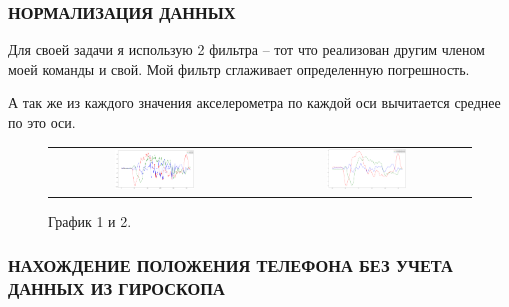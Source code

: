 \subsubsection{НОРМАЛИЗАЦИЯ ДАННЫХ}
Для своей задачи я использую 2 фильтра – тот что реализован другим членом моей команды и свой. Мой фильтр сглаживает определенную погрешность. 

\begin{figure}[H]
\end{figure}

А так же из каждого значения акселерометра по каждой оси вычитается среднее по это оси.

\begin{figure}[H]
    \begin{center}
        \begin{tabular}{cc}
            \includegraphics[width=0.4\textwidth]{sam_images/graph_1.png} & 
            \includegraphics[width=0.4\textwidth]{sam_images/graph_2.png} \\
        \end{tabular}
    \end{center}
    \caption{График 1 и 2.}
\end{figure}

\subsubsection{НАХОЖДЕНИЕ ПОЛОЖЕНИЯ ТЕЛЕФОНА БЕЗ УЧЕТА ДАННЫХ ИЗ ГИРОСКОПА}

